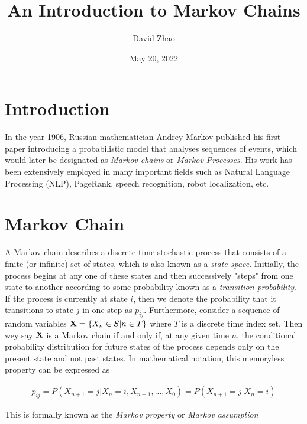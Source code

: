 \documentclass[a4paper,12pt]{article}
\theoremstyle{definition}
\let\oldtextbf\mathbf
\renewcommand{\mathbf}[1]{\oldtextbf{\boldmath #1}}
\begin{document}
\title{An Introduction to Markov Chains}
\author{David Zhao}
\date{May 20, 2022}
\maketitle
{}

\section*{Introduction}

In the year 1906, Russian mathematician Andrey Markov published his first paper
introducing a probabilistic model that analyses sequences of events, 
which would later be designated as \emph{Markov chains} or \emph{Markov Processes}. His work has been extensively employed
in many important fields such as Natural Language Processing (NLP), PageRank, speech recognition, robot localization, etc.

\section{Markov Chain}

	A Markov chain describes a discrete-time stochastic process that consists of a finite (or infinite) set of states, 
	which is also known as a \emph{state space}. Initially, the process begins at any 
	one of these states and then successively "steps" from one state to another according to some probability known as 
	a \emph{transition probability}. If the process is currently at state $i$, then we denote the probability 
	that it transitions to state $j$ in one step as $p_{ij}$.
	\newline
	Furthermore, consider a sequence of random variables $\mathbf{X} = \{X_n \in S | n \in T\}$ where $T$ is a discrete time index 
	set. Then wey say $\mathbf{X}$ is a Markov chain if and only if, at any given time $n$, the conditional probability distribution for future states
	of the process depends only on the present state and not past states. In mathematical notation, this memoryless
	property can be expressed as

	\begin{equation*}
		\begin{aligned}
			p_{ij} = P(X_{n+1} = j | X_{n} = i, X_{n-1}, ... , X_0) = P(X_{n+1} = j | X_{n}= i)
		\end{aligned}
	\end{equation*}

	This is formally known as the \emph{Markov property} or \emph{Markov assumption}
	
\end{document}
